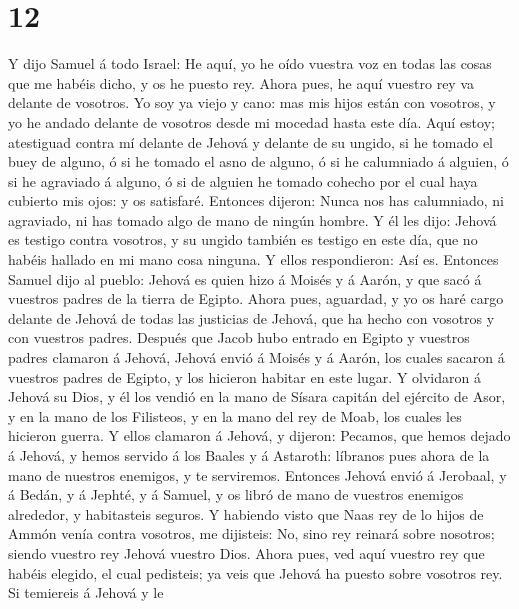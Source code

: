 \hypertarget{section-11}{%
\section{12}\label{section-11}}

 Y dijo Samuel á todo Israel: He aquí, yo he oído vuestra
voz en todas las cosas que me habéis dicho, y os he puesto rey.
 Ahora pues, he aquí vuestro rey va delante de vosotros.
Yo soy ya viejo y cano: mas mis hijos están con vosotros, y yo he andado
delante de vosotros desde mi mocedad hasta este día.  Aquí
estoy; atestiguad contra mí delante de Jehová y delante de su ungido, si
he tomado el buey de alguno, ó si he tomado el asno de alguno, ó si he
calumniado á alguien, ó si he agraviado á alguno, ó si de alguien he
tomado cohecho por el cual haya cubierto mis ojos: y os satisfaré.
 Entonces dijeron: Nunca nos has calumniado, ni agraviado,
ni has tomado algo de mano de ningún hombre.  Y él les
dijo: Jehová es testigo contra vosotros, y su ungido también es testigo
en este día, que no habéis hallado en mi mano cosa ninguna. Y ellos
respondieron: Así es.  Entonces Samuel dijo al pueblo:
Jehová es quien hizo á Moisés y á Aarón, y que sacó á vuestros padres de
la tierra de Egipto.  Ahora pues, aguardad, y yo os haré
cargo delante de Jehová de todas las justicias de Jehová, que ha hecho
con vosotros y con vuestros padres.  Después que Jacob
hubo entrado en Egipto y vuestros padres clamaron á Jehová, Jehová envió
á Moisés y á Aarón, los cuales sacaron á vuestros padres de Egipto, y
los hicieron habitar en este lugar.  Y olvidaron á Jehová
su Dios, y él los vendió en la mano de Sísara capitán del ejército de
Asor, y en la mano de los Filisteos, y en la mano del rey de Moab, los
cuales les hicieron guerra.  Y ellos clamaron á Jehová, y
dijeron: Pecamos, que hemos dejado á Jehová, y hemos servido á los
Baales y á Astaroth: líbranos pues ahora de la mano de nuestros
enemigos, y te serviremos.  Entonces Jehová envió á
Jerobaal, y á Bedán, y á Jephté, y á Samuel, y os libró de mano de
vuestros enemigos alrededor, y habitasteis seguros.  Y
habiendo visto que Naas rey de lo hijos de Ammón venía contra vosotros,
me dijisteis: No, sino rey reinará sobre nosotros; siendo vuestro rey
Jehová vuestro Dios.  Ahora pues, ved aquí vuestro rey
que habéis elegido, el cual pedisteis; ya veis que Jehová ha puesto
sobre vosotros rey.  Si temiereis á Jehová y le
